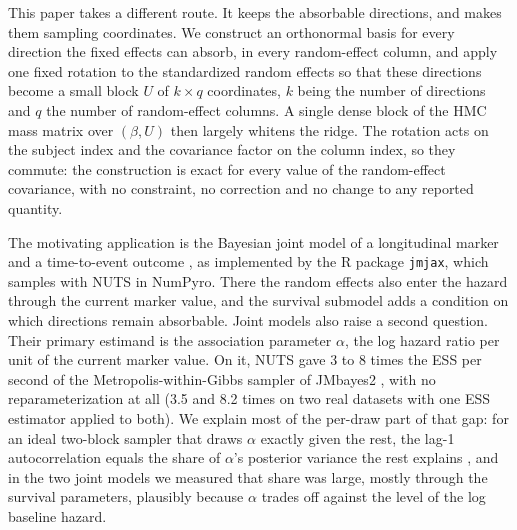 This paper takes a different route. It keeps the absorbable directions,
and makes them sampling coordinates. We construct an orthonormal basis for
every direction the fixed effects can absorb, in every random-effect
column, and apply one fixed rotation to the standardized random effects so
that these directions become a small block $U$ of $k \times q$ coordinates,
$k$ being the number of directions and $q$ the number of random-effect
columns. A single dense block of the HMC mass matrix over $(\beta, U)$
then largely whitens the ridge. The rotation acts on the subject index and the
covariance factor on the column index, so they commute: the construction is
exact for every value of the random-effect covariance, with no constraint,
no correction and no change to any reported quantity.

The motivating application is the Bayesian joint model of a longitudinal
marker and a time-to-event outcome
\citep{wulfsohn1997,henderson2000,tsiatis2004,rizopoulos2012}, as
implemented by the R package \texttt{jmjax}, which samples with NUTS in
NumPyro. There the random effects also enter the hazard through the current
marker value, and the survival submodel adds a condition on which
directions remain absorbable. Joint models also raise a second question.
Their primary estimand is the association parameter $\alpha$, the log
hazard ratio per unit of the current marker value. On it, NUTS gave 3 to 8 times the ESS per second of the Metropolis-within-Gibbs sampler of JMbayes2 \citep{jmbayes2}, with no reparameterization at all (3.5 and 8.2 times on two real datasets with one ESS estimator applied to both). We explain most of the per-draw part of that gap: for an ideal two-block sampler that draws $\alpha$ exactly given the rest, the
lag-1 autocorrelation equals the share of $\alpha$'s posterior variance
the rest explains \citep{liu1994}, and in the two joint models we measured that share was large, mostly through the survival parameters, plausibly because $\alpha$ trades off against the level of the log baseline hazard.

